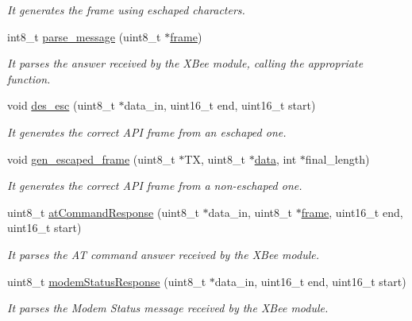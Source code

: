 \begin{DoxyCompactItemize}
\begin{DoxyCompactList}\small\item\em It generates the frame using eschaped characters. \end{DoxyCompactList}\item 
int8\+\_\+t \hyperlink{class_wasp_x_bee_core_a93ebddc150d4b7065f694ea431ab25c9}{parse\+\_\+message} (uint8\+\_\+t $\ast$\hyperlink{_wasp_frame_8h_a6240aaba878a8368af0eead8dc7759a4}{frame})
\begin{DoxyCompactList}\small\item\em It parses the answer received by the X\+Bee module, calling the appropriate function. \end{DoxyCompactList}\item 
void \hyperlink{class_wasp_x_bee_core_a2e2ac26e42cadc7fed51fc15dabd2949}{des\+\_\+esc} (uint8\+\_\+t $\ast$data\+\_\+in, uint16\+\_\+t end, uint16\+\_\+t start)
\begin{DoxyCompactList}\small\item\em It generates the correct A\+PI frame from an eschaped one. \end{DoxyCompactList}\item 
void \hyperlink{class_wasp_x_bee_core_a4f7174699b8a96efeb0970328e80682f}{gen\+\_\+escaped\+\_\+frame} (uint8\+\_\+t $\ast$TX, uint8\+\_\+t $\ast$\hyperlink{class_wasp_x_bee_core_a81f1c2af5c45fc8e3b63f8f21b3df17f}{data}, int $\ast$final\+\_\+length)
\begin{DoxyCompactList}\small\item\em It generates the correct A\+PI frame from a non-\/eschaped one. \end{DoxyCompactList}\item 
uint8\+\_\+t \hyperlink{class_wasp_x_bee_core_ae24491c5065437a62866fe1e4278776b}{at\+Command\+Response} (uint8\+\_\+t $\ast$data\+\_\+in, uint8\+\_\+t $\ast$\hyperlink{_wasp_frame_8h_a6240aaba878a8368af0eead8dc7759a4}{frame}, uint16\+\_\+t end, uint16\+\_\+t start)
\begin{DoxyCompactList}\small\item\em It parses the AT command answer received by the X\+Bee module. \end{DoxyCompactList}\item 
uint8\+\_\+t \hyperlink{class_wasp_x_bee_core_af723e3ab1f4d9c382e123482d5ea6205}{modem\+Status\+Response} (uint8\+\_\+t $\ast$data\+\_\+in, uint16\+\_\+t end, uint16\+\_\+t start)
\begin{DoxyCompactList}\small\item\em It parses the Modem Status message received by the X\+Bee module. \end{DoxyCompactList}\item 

\end{DoxyCompactItemize}
